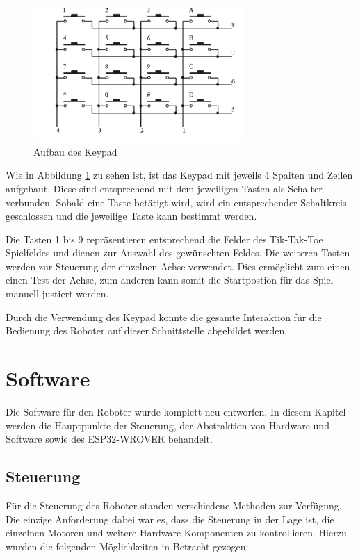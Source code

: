 \documentclass[conference,compsoc,final,a4paper]{IEEEtran}
\begin{document}
\begin{figure}[h]
\includegraphics[width=8cm]{../images/keypad.png}
\caption{Aufbau des Keypad \autocite{freenoveTutorial}}\label{Elektrik:Keypad}
\end{figure}

Wie in Abbildung \ref{Elektrik:Keypad} zu sehen ist, ist das Keypad mit jeweils 4 Spalten und Zeilen aufgebaut. Diese sind entsprechend mit dem jeweiligen Tasten als Schalter verbunden. 
Sobald eine Taste betätigt wird, wird ein entsprechender Schaltkreis geschlossen und die jeweilige Taste kann bestimmt werden.

Die Tasten 1 bis 9 repräsentieren entsprechend die Felder des Tik-Tak-Toe Spielfeldes und dienen zur Auswahl des gewünschten Feldes. 
Die weiteren Tasten werden zur Steuerung der einzelnen Achse verwendet.
Dies ermöglicht zum einen einen Test der Achse, zum anderen kann somit die Startpostion für das Spiel manuell justiert werden.

Durch die Verwendung des Keypad konnte die gesamte Interaktion für die Bedienung des Roboter auf dieser Schnittstelle abgebildet werden.

\section{Software}

Die Software für den Roboter wurde komplett neu entworfen. In diesem Kapitel werden die Hauptpunkte
der Steuerung, der Abstraktion von Hardware und Software sowie des ESP32-WROVER behandelt.

\subsection{Steuerung}
Für die Steuerung des Roboter standen verschiedene Methoden zur Verfügung. Die einzige Anforderung dabei
war es, dass die Steuerung in der Lage ist, die einzelnen Motoren und weitere Hardware Komponenten
zu kontrollieren. Hierzu wurden die folgenden Möglichkeiten in Betracht gezogen:
\end{document}
